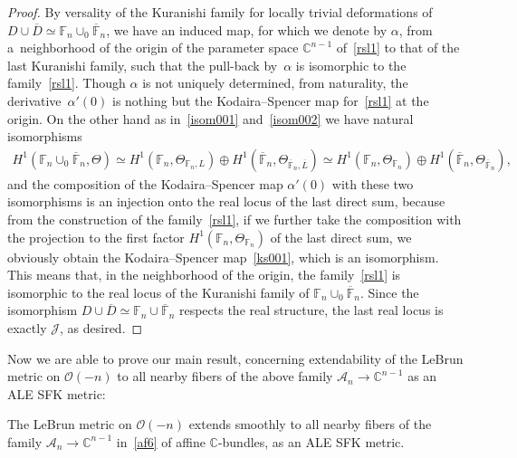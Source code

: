 \begin{proof}
By versality of the Kuranishi family for locally trivial deformations of $D\cup\overline D\simeq\mathbb{F}_n\cup_0
\overline{\mathbb{F}}_n$, we have an induced map, for which we denote by $\alpha$, from a~neighborhood of the origin of
the parameter space $\mathbb{C}^{n-1}$ of~\eqref{rsl1} to that of the last Kuranishi family, such that the pull-back by~$\alpha$ is isomorphic to the family~\eqref{rsl1}.
Though $\alpha$ is not uniquely determined, from naturality, the derivative~$\alpha'(0)$ is nothing but the
Kodaira--Spencer map for~\eqref{rsl1} at the origin.
On the other hand as in~\eqref{isom001} and~\eqref{isom002} we have natural isomorphisms
\begin{gather*}
H^1(\mathbb{F}_n \cup_0 \overline{\mathbb{F}}_n,\Theta) \simeq H^1(\mathbb{F}_n, \Theta_{\mathbb{F}_n,L}) \oplus H^1
(\overline{\mathbb{F}}_n,\Theta_{\overline{\mathbb{F}}_n,\overline L}) \simeq H^1(\mathbb{F}_n, \Theta_{\mathbb{F}_n})
\oplus H^1 (\overline{\mathbb{F}}_n,\Theta_{\overline{\mathbb{F}}_n}),
\end{gather*}
and the composition of the Kodaira--Spencer map $\alpha'(0)$ with these two isomorphisms is an injection onto the real
locus of the last direct sum, because from the construction of the family~\eqref{rsl1}, if we further take the
composition with the projection to the f\/irst factor $H^1(\mathbb{F}_n, \Theta_{\mathbb{F}_n})$ of the last direct sum,
we obviously obtain the Kodaira--Spencer map~\eqref{ks001}, which is an isomorphism.
This means that, in the neighborhood of the origin, the family~\eqref{rsl1} is isomorphic to the real locus of the
Kuranishi family of $\mathbb{F}_n\cup_0\overline{\mathbb{F}}_n$.
Since the isomorphism $D\cup\overline D \simeq \mathbb{F}_n\cup\overline{\mathbb{F}}_n$ respects the real structure, the
last real locus is exactly $\mathscr J$, as desired.
\end{proof}

Now we are able to prove our main result, concerning extendability of the LeBrun metric on $\mathscr O(-n)$ to all
nearby f\/ibers of the above family $\mathscr A_n\to \mathbb{C}^{n-1}$ as an ALE SFK metric:

\begin{Theorem}
\label{thm:main01}
The LeBrun metric on $\mathscr O(-n)$ extends smoothly to all nearby fibers of the family $\mathscr
A_n\to\mathbb{C}^{n-1}$ in~\eqref{af6} of affine $\mathbb{C}$-bundles, as an ALE SFK metric.
\end{Theorem}


